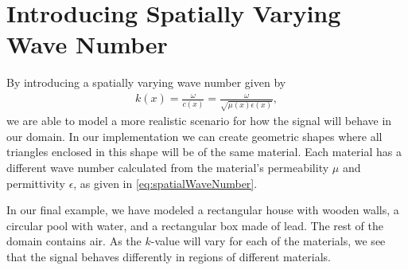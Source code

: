 \documentclass[10pt,a4paper]{article}
\begin{document}
\section*{Introducing Spatially Varying Wave Number}
By introducing a spatially varying wave number given by
\begin{align}\label{eq:spatialWaveNumber}
k(x) = \frac{\omega}{c(x)} = \frac{\omega}{\sqrt{\mu(x)\epsilon(x)}},
\end{align}
we are able to model a more realistic scenario for how the signal will behave in our domain. In our implementation we can create geometric shapes where all triangles enclosed in this shape will be of the same material. Each material has a different wave number calculated from the material's permeability $\mu$ and permittivity $\epsilon$, as given in \eqref{eq:spatialWaveNumber}.

In our final example, we have modeled a rectangular house with wooden walls, a circular pool with water, and a rectangular box made of lead. The rest of the domain contains air. As the $k$-value will vary for each of the materials, we see that the signal behaves differently in regions of different materials.
\end{document}

